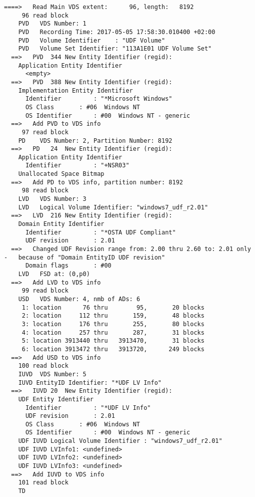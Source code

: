 \begin{lstlisting}
====>   Read Main VDS extent:      96, length:   8192
     96 read block
    PVD   VDS Number: 1
    PVD   Recording Time: 2017-05-05 17:58:30.010400 +02:00
    PVD   Volume Identifier    : "UDF Volume"
    PVD   Volume Set Identifier: "113A1E01 UDF Volume Set"
  ==>   PVD  344 New Entity Identifier (regid):
    Application Entity Identifier
      <empty>
  ==>   PVD  388 New Entity Identifier (regid):
    Implementation Entity Identifier
      Identifier         : "*Microsoft Windows"
      OS Class       : #06  Windows NT
      OS Identifier      : #00  Windows NT - generic
  ==>   Add PVD to VDS info
     97 read block
    PD    VDS Number: 2, Partition Number: 8192
  ==>   PD   24  New Entity Identifier (regid):
    Application Entity Identifier
      Identifier         : "+NSR03"
    Unallocated Space Bitmap
  ==>   Add PD to VDS info, partition number: 8192
     98 read block
    LVD   VDS Number: 3
    LVD   Logical Volume Identifier: "windows7_udf_r2.01"
  ==>   LVD  216 New Entity Identifier (regid):
    Domain Entity Identifier
      Identifier         : "*OSTA UDF Compliant"
      UDF revision       : 2.01
  ==>   Changed UDF Revision range from: 2.00 thru 2.60 to: 2.01 only
-   because of "Domain EntityID UDF revision"
      Domain flags       : #00
    LVD   FSD at: (0,p0)
  ==>   Add LVD to VDS info
     99 read block
    USD   VDS Number: 4, nmb of ADs: 6
     1: location      76 thru        95,       20 blocks
     2: location     112 thru       159,       48 blocks
     3: location     176 thru       255,       80 blocks
     4: location     257 thru       287,       31 blocks
     5: location 3913440 thru   3913470,       31 blocks
     6: location 3913472 thru   3913720,      249 blocks
  ==>   Add USD to VDS info
    100 read block
    IUVD  VDS Number: 5
    IUVD EntityID Identifier: "*UDF LV Info"
  ==>   IUVD 20  New Entity Identifier (regid):
    UDF Entity Identifier
      Identifier         : "*UDF LV Info"
      UDF revision       : 2.01
      OS Class       : #06  Windows NT
      OS Identifier      : #00  Windows NT - generic
    UDF IUVD Logical Volume Identifier : "windows7_udf_r2.01"
    UDF IUVD LVInfo1: <undefined>
    UDF IUVD LVInfo2: <undefined>
    UDF IUVD LVInfo3: <undefined>
  ==>   Add IUVD to VDS info
    101 read block
    TD  


\end{lstlisting}
